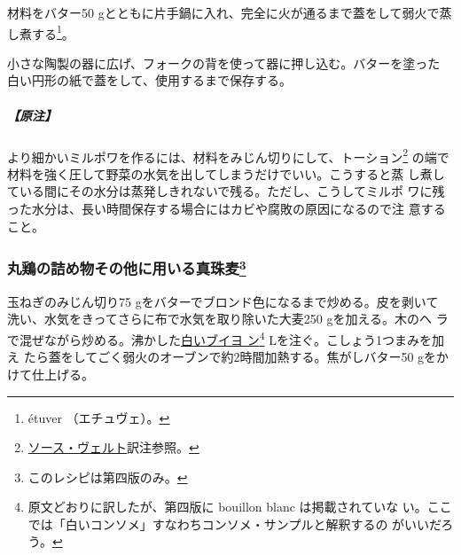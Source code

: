 \begin{recette}
材料をバター50
gとともに片手鍋に入れ、完全に火が通るまで蓋をして弱火で蒸し煮する\footnote{étuver
  （エチュヴェ）。}。

小さな陶製の器に広げ、フォークの背を使って器に押し込む。バターを塗った
白い円形の紙で蓋をして、使用するまで保存する。

\hypertarget{ux539fux6ce8-1}{%
\subparagraph{【原注】}\label{ux539fux6ce8-1}}

より細かいミルポワを作るには、材料をみじん切りにして、トーション\footnote{\protect\hyperlink{sauce-verte}{ソース・ヴェルト}訳注参照。}
の端で材料を強く圧して野菜の水気を出してしまうだけでいい。こうすると蒸
し煮している間にその水分は蒸発しきれないで残る。ただし、こうしてミルポ
ワに残った水分は、長い時間保存する場合にはカビや腐敗の原因になるので注
意すること。

\maeaki

\hypertarget{orge-perle-pour-volailles-farcies}{%
\subsubsection[丸鶏の詰め物その他に用いる真珠麦]{\texorpdfstring{丸鶏の詰め物その他に用いる真珠麦\footnote{このレシピは第四版のみ。}}{丸鶏の詰め物その他に用いる真珠麦}}\label{orge-perle-pour-volailles-farcies}}



玉ねぎのみじん切り75 gをバターでブロンド色になるまで炒める。皮を剥いて
洗い、水気をきってさらに布で水気を取り除いた大麦250 gを加える。木のヘ
ラで混ぜながら炒める。沸かした\protect\hyperlink{consomme-blanc}{白いブイヨ
ン}\footnote{原文どおりに訳したが、第四版に bouillon blanc
  は掲載されていな
  い。ここでは「白いコンソメ」すなわちコンソメ・サンプルと解釈するの
  がいいだろう。}\troisquarts{} Lを注ぐ。こしょう1つまみを加え
たら蓋をしてごく弱火のオーブンで約2時間加熱する。焦がしバター50 gをか
けて仕上げる。


\end{recette}
